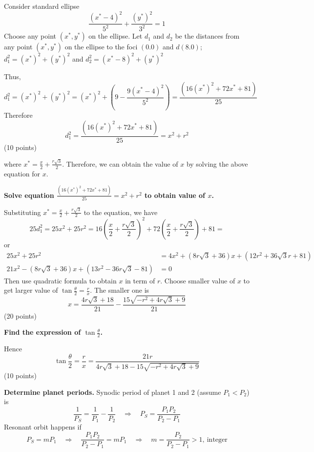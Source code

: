 \begin{description}
  Consider standard ellipse
  \[
    \frac{(x^* - 4)^2}{5^2} + \frac{(y^*)^2}{3^2} = 1
  \]
  Choose any point $(x^*, y^*)$ on the ellipse. Let $d_1$ and $d_2$ be the
  distances from any point $(x^*, y^*)$ on the ellipse to the foci $(0.0)$
  and $d(8.0)$; $d_1^2 = (x^*)^2 + (y^*)^2$ and
  $d_2^2 = (x^* - 8)^2 + (y^*)^2$

  Thus,
  \[
    d_1^2 = (x^*)^2 + (y^*)^2
      = (x^*)^2 + \left(9 - \frac{9(x^* - 4)^2}{5^2}\right)
      = \frac{(16(x^*)^2 + 72x^* + 81)}{25}
  \]
  Therefore
  \[
    d_1^2 = \frac{(16(x^*)^2 + 72x^* + 81)}{25} = x^2 + r^2
  \]
  \hfill(10 points)

  where $x^* = \frac{x}{2} + \frac{r\sqrt{3}}{2}$. Therefore, we can obtain
  the value of $x$ by solving the above equation for $x$.

  \textbf{Solve equation
  $\frac{(16(x^*)^2 + 72x^* + 81)}{25} = x^2 + r^2$ to obtain value of $x$.}

  Substituting $x^* = \frac{x}{2} + \frac{r\sqrt{3}}{2}$ to the equation, we
  have
  \[
    25d_1^2 = 25x^2 + 25r^2
      = 16\left(\frac{x}{2} + \frac{r\sqrt{3}}{2}\right)^2
      + 72\left(\frac{x}{2} + \frac{r\sqrt{3}}{2}\right) + 81 = %
  \]
  or
  \begin{align*}
    25x^2 + 25r^2 &= 4x^2 + \left(8r\sqrt{3} + 36\right)x
      + \left(12r^2 + 36\sqrt{3}r + 81\right) \\
    21x^2 - \left(8r\sqrt{3} + 36\right)x
      + \left(13r^2 - 36r\sqrt{3} - 81\right) &= 0
  \end{align*}
  Then use quadratic formula to obtain $x$ in term of $r$. Choose smaller
  value of $x$ to get larger value of
  $\tan\frac{\theta}{2} = \frac{r}{x}$. The smaller one is
  \[
    x = \frac{4r\sqrt{3} + 18}{21}
      - \frac{15\sqrt{-r^2 + 4r\sqrt{3} + 9}}{21}
  \]
  \hfill(20 points)

  \textbf{Find the expression of $\tan\frac{\theta}{2}$.}

  Hence
  \[
    \tan\frac{\theta}{2} = \frac{r}{x}
      = \frac{21r}{4r\sqrt{3} + 18 - 15\sqrt{-r^2 + 4r\sqrt{3} + 9}}
  \]
  \hfill(10 points)
\end{description}

\textbf{Determine planet periods.}
Synodic period of planet 1 and 2 (assume $P_1 < P_2$) is
\[ \frac{1}{P_S} = \frac{1}{P_1} - \frac{1}{P_2}
   \quad\Rightarrow\quad
   P_S = \frac{P_1 P_2}{P_2 - P_1} \]
Resonant orbit happens if
\[ P_S = mP_1
   \quad\Rightarrow\quad
   \frac{P_1 P_2}{P_2 - P_1} = mP_1
   \quad\Rightarrow\quad
   m = \frac{P_2}{P_2 - P_1} > 1,\ \text{integer} \]


